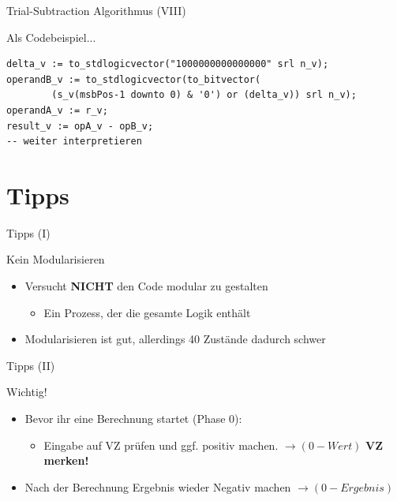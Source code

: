   \begin{frame} [fragile] {Trial-Subtraction Algorithmus (VIII)}
    \begin{exampleblock} {}
      Als Codebeispiel...
    \end{exampleblock}
    \begin{lstlisting}
delta_v := to_stdlogicvector("1000000000000000" srl n_v);
operandB_v := to_stdlogicvector(to_bitvector(
        (s_v(msbPos-1 downto 0) & '0') or (delta_v)) srl n_v);
operandA_v := r_v;
result_v := opA_v - opB_v;
-- weiter interpretieren
    \end{lstlisting}
  \end{frame}


  \section{Tipps}
  \begin{frame} {Tipps (I)}
    \begin{block} {Kein Modularisieren}
      \begin{itemize}
        \item Versucht \textbf{NICHT} den Code modular zu gestalten
        \begin{itemize}
          \item Ein Prozess, der die gesamte Logik enthält
        \end{itemize} 
        \item Modularisieren ist gut, allerdings 40 Zustände dadurch schwer
      \end{itemize}
    \end{block}
  \end{frame}

  \begin{frame} {Tipps (II)}
    \begin{alertblock} {Wichtig!}
      \begin{itemize}
        \item Bevor ihr eine Berechnung startet (Phase 0):
        \begin{itemize}
          \item Eingabe auf VZ prüfen und ggf. positiv machen. $\rightarrow 
                (0-Wert)$ \textbf{VZ merken!}
        \end{itemize} 
        \item Nach der Berechnung Ergebnis wieder Negativ machen $\rightarrow 
              (0-Ergebnis)$
      \end{itemize}
    \end{alertblock}    
  \end{frame}

